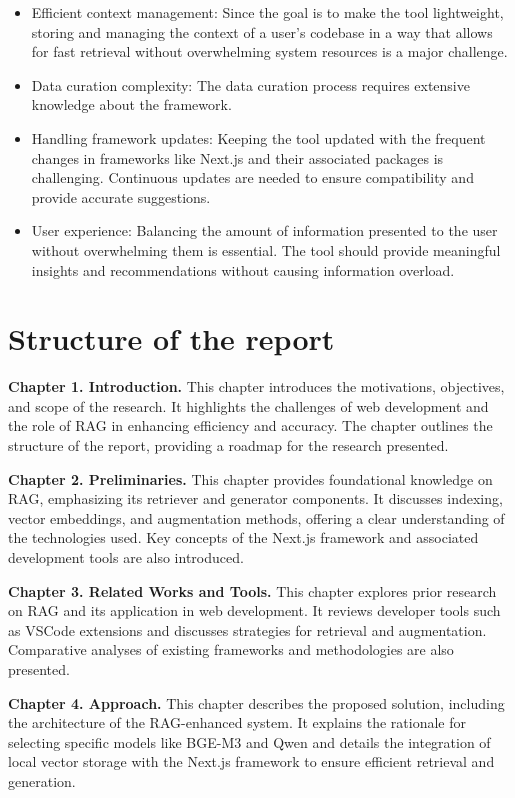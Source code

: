 \begin{itemize}
  \item Efficient context management: Since the goal is to make the tool lightweight, storing and managing the context of a user's codebase in a way that allows for fast retrieval without overwhelming system resources is a major challenge.
  \item Data curation complexity: The data curation process requires extensive knowledge about the framework.
  \item Handling framework updates: Keeping the tool updated with the frequent changes in frameworks like Next.js and their associated packages is challenging. Continuous updates are needed to ensure compatibility and provide accurate suggestions.
  \item User experience: Balancing the amount of information presented to the user without overwhelming them is essential. The tool should provide meaningful insights and recommendations without causing information overload.
\end{itemize}

\section{Structure of the report}

\textbf{Chapter 1. Introduction.} 
This chapter introduces the motivations, objectives, and scope of the research. It highlights the challenges of web development and the role of RAG in enhancing efficiency and accuracy. The chapter outlines the structure of the report, providing a roadmap for the research presented.

\textbf{Chapter 2. Preliminaries.} 
This chapter provides foundational knowledge on RAG, emphasizing its retriever and generator components. It discusses indexing, vector embeddings, and augmentation methods, offering a clear understanding of the technologies used. Key concepts of the Next.js framework and associated development tools are also introduced.

\textbf{Chapter 3. Related Works and Tools.} 
This chapter explores prior research on RAG and its application in web development. It reviews developer tools such as VSCode extensions and discusses strategies for retrieval and augmentation. Comparative analyses of existing frameworks and methodologies are also presented.

\textbf{Chapter 4. Approach.} 
This chapter describes the proposed solution, including the architecture of the RAG-enhanced system. It explains the rationale for selecting specific models like BGE-M3 and Qwen and details the integration of local vector storage with the Next.js framework to ensure efficient retrieval and generation.

